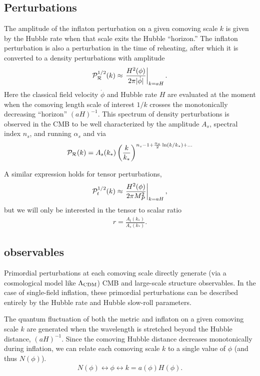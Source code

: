 \documentclass[aps,amsfonts,amsmath,prd,preprint,nofootinbib]{revtex4}
\newcommand{\MMp}{{M_P^2}}
\begin{document}
\subsection{Perturbations}
The amplitude of the inflaton perturbation on a given comoving scale $k$ is given by the Hubble rate when that
scale exits the Hubble ``horizon.''   The inflaton perturbation is also a perturbation in the time of reheating, after which it is converted to a density perturbations with
amplitude
\begin{align}
{\cal P}_{\cal R}^{1/2}(k) \approx \left.\frac{H^2(\phi)}{2\pi|\dot\phi|}\right|_{k = a H}.
\end{align}
Here the classical field velocity $\dot\phi$ and Hubble rate $H$ are evaluated at the moment when the comoving length scale of interest $1/k$ crosses the monotonically decreasing ``horizon'' $(aH)^{-1}$.
This spectrum of density perturbations is observed in the CMB to be well characterized by the amplitude $A_s$, spectral index $n_s$, and running $\alpha_s$ and via
\begin{align}
 {\cal P}_{\cal R}(k) = A_s(k_\ast)\left(\frac{k}{k_\ast}\right)^{n_s - 1 + \frac{\alpha_s}{2}\ln(k/k_\ast) + ...}
\end{align}

A similar expression holds for tensor perturbations, 
\begin{align}
{\cal P}_{t}^{1/2}(k) \approx \left.\frac{H^2(\phi)}{2\pi\MMp}\right|_{k = a H},
\end{align}
but we will only be interested in the tensor to scalar ratio
\begin{align}
r = \frac{A_t(k_\ast)}{A_s(k_\ast)}.
\end{align}


\subsection{observables}
Primordial perturbations at each comoving scale directly 
generate (via a cosmological model like $\Lambda_{\rm CDM}$) CMB and large-scale structure observables.   In the case of single-field inflation, these primordial perturbations can 
be described entirely by the Hubble rate and Hubble slow-roll parameters.

The quantum fluctuation of both the metric and inflaton on a given comoving scale $k$ are generated when the wavelength is stretched beyond the Hubble distance, $(a H)^{-1}$.
Since the comoving Hubble distance decreases monotonically during inflation, we can relate each comoving scale $k$ to a single value of $\phi$ (and thus $N(\phi)$). 
\begin{align}
N(\phi) \longleftrightarrow \phi \longleftrightarrow k = a(\phi) H(\phi).
\end{align}  
\end{document}
